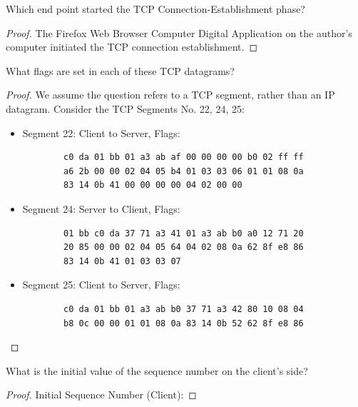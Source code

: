 \documentclass[../main.tex]{subfiles}
\begin{document}
\begin{wts}
	Which end point started the TCP Connection-Establishment phase?
\end{wts}
\begin{proof}
    The Firefox Web Browser Computer Digital Application on the author's computer  initiated the TCP connection establishment. 
\end{proof}
\newpage

\begin{wts}
	What flags are set in each of these TCP datagrams?
\end{wts}
\begin{proof}
    We assume the question refers to a TCP segment, rather than an IP datagram. Consider the TCP Segments No. 22, 24, 25:\\
    \begin{itemize}
        \item Segment 22: Client to Server, Flags: 
        \begin{lstlisting}
        c0 da 01 bb 01 a3 ab af 00 00 00 00 b0 02 ff ff
        a6 2b 00 00 02 04 05 b4 01 03 03 06 01 01 08 0a
        83 14 0b 41 00 00 00 00 04 02 00 00\end{lstlisting}
        
        \item Segment 24: Server to Client, Flags: 
        \begin{lstlisting}
        01 bb c0 da 37 71 a3 41 01 a3 ab b0 a0 12 71 20
        20 85 00 00 02 04 05 64 04 02 08 0a 62 8f e8 86
        83 14 0b 41 01 03 03 07\end{lstlisting}
        
        \item Segment 25: Client to Server, Flags: 
         \begin{lstlisting}
        c0 da 01 bb 01 a3 ab b0 37 71 a3 42 80 10 08 04
        b8 0c 00 00 01 01 08 0a 83 14 0b 52 62 8f e8 86\end{lstlisting}
    \end{itemize}
    
\end{proof}
\newpage

\begin{wts}
	What is the initial value of the sequence number on the client’s side?
\end{wts}
\begin{proof}
    Initial Sequence Number (Client): 		
\end{proof}
\newpage
\end{document}
